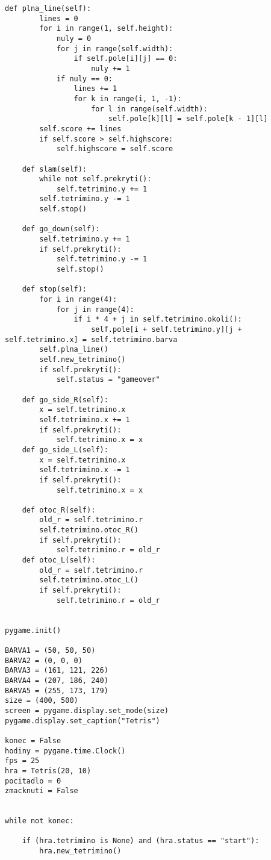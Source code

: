 \documentclass[12pt]{report}			%
\begin{document}
\begin{appendices}
\begin{lstlisting}[title={Program tetris.py}, caption={tetris.py}, 							label={lst:tetris.py}]
    def plna_line(self):
        lines = 0
        for i in range(1, self.height):
            nuly = 0
            for j in range(self.width):
                if self.pole[i][j] == 0:
                    nuly += 1
            if nuly == 0:
                lines += 1
                for k in range(i, 1, -1):
                    for l in range(self.width):
                        self.pole[k][l] = self.pole[k - 1][l]
        self.score += lines
        if self.score > self.highscore:
            self.highscore = self.score

    def slam(self):
        while not self.prekryti():
            self.tetrimino.y += 1
        self.tetrimino.y -= 1
        self.stop()

    def go_down(self):
        self.tetrimino.y += 1
        if self.prekryti():
            self.tetrimino.y -= 1
            self.stop()

    def stop(self):
        for i in range(4):
            for j in range(4):
                if i * 4 + j in self.tetrimino.okoli():
                    self.pole[i + self.tetrimino.y][j + self.tetrimino.x] = self.tetrimino.barva
        self.plna_line()
        self.new_tetrimino()
        if self.prekryti():
            self.status = "gameover"

    def go_side_R(self):
        x = self.tetrimino.x
        self.tetrimino.x += 1
        if self.prekryti():
            self.tetrimino.x = x
    def go_side_L(self):
        x = self.tetrimino.x
        self.tetrimino.x -= 1
        if self.prekryti():
            self.tetrimino.x = x

    def otoc_R(self):
        old_r = self.tetrimino.r
        self.tetrimino.otoc_R()
        if self.prekryti():
            self.tetrimino.r = old_r
    def otoc_L(self):
        old_r = self.tetrimino.r
        self.tetrimino.otoc_L()
        if self.prekryti():
            self.tetrimino.r = old_r


pygame.init()

BARVA1 = (50, 50, 50)
BARVA2 = (0, 0, 0)
BARVA3 = (161, 121, 226)
BARVA4 = (207, 186, 240)
BARVA5 = (255, 173, 179)
size = (400, 500)
screen = pygame.display.set_mode(size)
pygame.display.set_caption("Tetris")

konec = False
hodiny = pygame.time.Clock()
fps = 25
hra = Tetris(20, 10)
pocitadlo = 0
zmacknuti = False


while not konec:

    if (hra.tetrimino is None) and (hra.status == "start"):
        hra.new_tetrimino()


\end{lstlisting}
\end{appendices}
\end{document}
